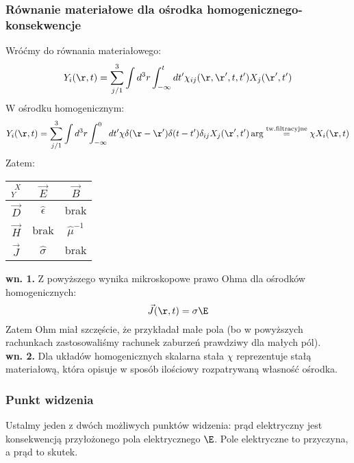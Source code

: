 \subsubsection{Równanie materiałowe dla ośrodka homogenicznego- konsekwencje}
Wróćmy do równania materiałowego:
\begin{equation} {Y}_i(\r,t)=\sum_{j/1}^3 \int d^3r \int_{-\infty}^t dt' {\chi}_{ij}(\r,\r',t,t') X_j(\r',t') \end{equation}
W ośrodku homogenicznym:
\begin{equation} {Y}_i(\r,t)=\sum_{j/1}^3 \int d^3r \int_{-\infty}^0 dt' {\chi}\delta(\r-\r')\delta(t-t')\delta_{ij} X_j(\r',t')\arg 
\stackrel{\text{tw.filtracyjne}}{=}\chi X_i(\r,t) \end{equation}
Zatem:\\
\begin{center}
\begin{tabular}{|c||c|c|}
  \hline
 ${_Y^{~~X}}$ & $\vec{E}$ & $\vec{B}$\\
  \hline\hline
  $\vec{D}$ &  $\hat{\epsilon}$ & brak \\
\hline
  $\vec{H}$ &  brak & $\hat{\mu}^{-1}$ \\
  \hline
  $\vec{J}$ &  $\hat{\sigma}$ &  brak\\
    \hline
\end{tabular} 
\end{center}
\textbf{wn. 1.} Z powyższego wynika mikroskopowe prawo Ohma dla ośrodków homogenicznych: \begin{equation} \vec{J}(\r,t)=\sigma\E \end{equation}
Zatem Ohm miał szczęście, że przykładał małe pola (bo w powyższych rachunkach zastosowaliśmy rachunek zaburzeń prawdziwy dla małych pól).\\
\textbf{wn. 2.} Dla układów homogenicznych skalarna stała $\chi$ reprezentuje stałą materiałową, która opisuje w sposób ilościowy rozpatrywaną własność ośrodka.
\subsubsection{Punkt widzenia}
Ustalmy jeden z dwóch możliwych punktów widzenia:
prąd elektryczny jest konsekwencją przyłożonego pola elektrycznego $\E$. Pole elektryczne to przyczyna, a prąd to skutek.
